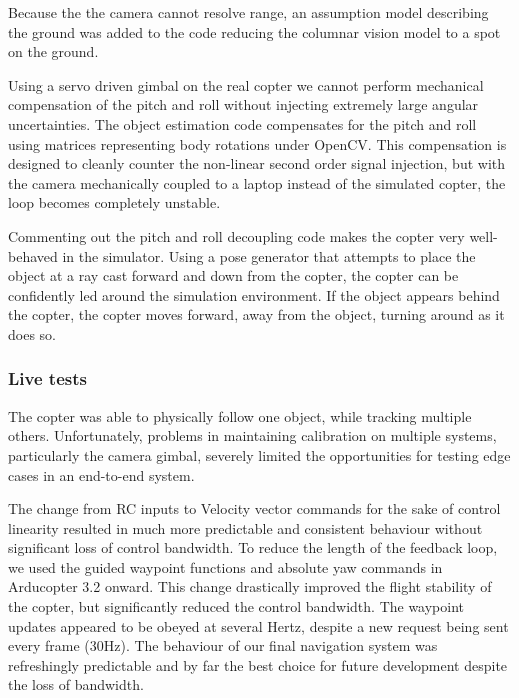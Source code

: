 \documentclass{article}
\newcounter{subsubsubsection}[subsubsection]
\begin{document}
      Because the the camera cannot resolve range, an assumption model describing the ground was added to the code reducing the columnar vision model to a spot on the ground.

      Using a servo driven gimbal on the real copter we cannot perform mechanical compensation of the pitch and roll without injecting extremely large angular uncertainties.
      The object estimation code compensates for the pitch and roll using matrices representing body rotations under OpenCV.
      This compensation is designed to cleanly counter the non-linear second order signal injection, but with the camera mechanically coupled to a laptop instead of the simulated copter, the loop becomes completely unstable.

      Commenting out the pitch and roll decoupling code makes the copter very well-behaved in the simulator.  Using a pose generator that attempts to place the object at a ray cast forward and down from the copter, the copter can be confidently led around the simulation environment.  If the object appears behind the copter, the copter moves forward, away from the object, turning around as it does so.

    \subsubsection{Live tests}
      The copter was able to physically follow one object, while tracking multiple others.  Unfortunately, problems in maintaining calibration on multiple systems, particularly the camera gimbal, severely limited the opportunities for testing edge cases in an end-to-end system.

        The change from RC inputs to Velocity vector commands for the sake of control linearity resulted in much more predictable and consistent behaviour without significant loss of control bandwidth.
        To reduce the length of the feedback loop, we used the guided waypoint functions and absolute yaw commands in Arducopter 3.2 onward.  This change drastically improved the flight stability of the copter, but significantly reduced the control bandwidth.  The waypoint updates appeared to be obeyed at several Hertz, despite a new request being sent every frame (30Hz).
        The behaviour of our final navigation system was refreshingly predictable and by far the best choice for future development despite the loss of bandwidth.
      
\end{document}
